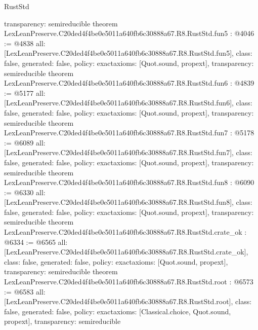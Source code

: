 \begin{lexlean}{RustStd}
\begin{coremodule}
{  transparency: semireducible
}
theorem LexLeanPreserve.C20ded4f4be0e5011a640fb6c30888a67.R8.RustStd.fun5 : @4046 := @4838 {
  all: [LexLeanPreserve.C20ded4f4be0e5011a640fb6c30888a67.R8.RustStd.fun5],
  class: false,
  generated: false,
  policy: exact{axioms: [Quot.sound, propext]},
  transparency: semireducible
}
theorem LexLeanPreserve.C20ded4f4be0e5011a640fb6c30888a67.R8.RustStd.fun6 : @4839 := @5177 {
  all: [LexLeanPreserve.C20ded4f4be0e5011a640fb6c30888a67.R8.RustStd.fun6],
  class: false,
  generated: false,
  policy: exact{axioms: [Quot.sound, propext]},
  transparency: semireducible
}
theorem LexLeanPreserve.C20ded4f4be0e5011a640fb6c30888a67.R8.RustStd.fun7 : @5178 := @6089 {
  all: [LexLeanPreserve.C20ded4f4be0e5011a640fb6c30888a67.R8.RustStd.fun7],
  class: false,
  generated: false,
  policy: exact{axioms: [Quot.sound, propext]},
  transparency: semireducible
}
theorem LexLeanPreserve.C20ded4f4be0e5011a640fb6c30888a67.R8.RustStd.fun8 : @6090 := @6330 {
  all: [LexLeanPreserve.C20ded4f4be0e5011a640fb6c30888a67.R8.RustStd.fun8],
  class: false,
  generated: false,
  policy: exact{axioms: [Quot.sound, propext]},
  transparency: semireducible
}
theorem LexLeanPreserve.C20ded4f4be0e5011a640fb6c30888a67.R8.RustStd.crate_ok : @6334 := @6565 {
  all: [LexLeanPreserve.C20ded4f4be0e5011a640fb6c30888a67.R8.RustStd.crate_ok],
  class: false,
  generated: false,
  policy: exact{axioms: [Quot.sound, propext]},
  transparency: semireducible
}
theorem LexLeanPreserve.C20ded4f4be0e5011a640fb6c30888a67.R8.RustStd.root : @6573 := @6583 {
  all: [LexLeanPreserve.C20ded4f4be0e5011a640fb6c30888a67.R8.RustStd.root],
  class: false,
  generated: false,
  policy: exact{axioms: [Classical.choice, Quot.sound, propext]},
  transparency: semireducible
}


\end{coremodule}
\end{lexlean}
